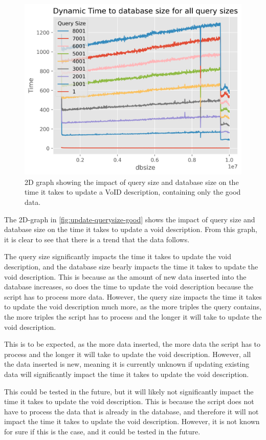 \begin{figure}[htb!]
    \centering
    \includegraphics[width=0.8\columnwidth]{figures/dynamic-time-query-size-good.png}
    \caption{2D graph showing the impact of query size and database size on the time it takes to update a VoID description, containing only the good data.}
    \label{fig:update-querysize-good}
\end{figure}


The 2D-graph in \autoref{fig:update-querysize-good} shows the impact of query size and database size on the time it takes to update a \gls{void} description. From this graph, it is clear to see that there is a trend that the data follows.

The query size significantly impacts the time it takes to update the \gls{void} description, and the database size bearly impacts the time it takes to update the \gls{void} description. This is because as the amount of new data inserted into the database increases, so does the time to update the \gls{void} description because the script has to process more data. However, the query size impacts the time it takes to update the \gls{void} description much more, as the more triples the query contains, the more triples the script has to process and the longer it will take to update the \gls{void} description.

This is to be expected, as the more data inserted, the more data the script has to process and the longer it will take to update the \gls{void} description. However, all the data inserted is new, meaning it is currently unknown if updating existing data will significantly impact the time it takes to update the \gls{void} description.

This could be tested in the future, but it will likely not significantly impact the time it takes to update the \gls{void} description. This is because the script does not have to process the data that is already in the database, and therefore it will not impact the time it takes to update the \gls{void} description. However, it is not known for sure if this is the case, and it could be tested in the future.

